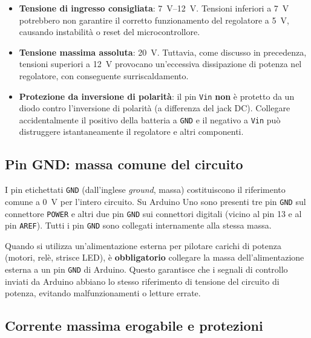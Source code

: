 \begin{itemize}
    \item \textbf{Tensione di ingresso consigliata}: \SIrange{7}{12}{\volt}. Tensioni inferiori a \SI{7}{\volt} potrebbero non garantire il corretto funzionamento del regolatore a \SI{5}{\volt}, causando instabilità o reset del microcontrollore.
    \item \textbf{Tensione massima assoluta}: \SI{20}{\volt}. Tuttavia, come discusso in precedenza, tensioni superiori a \SI{12}{\volt} provocano un'eccessiva dissipazione di potenza nel regolatore, con conseguente surriscaldamento.
    \item \textbf{Protezione da inversione di polarità}: il pin \texttt{Vin} \textbf{non} è protetto da un diodo contro l'inversione di polarità (a differenza del jack DC). Collegare accidentalmente il positivo della batteria a \texttt{GND} e il negativo a \texttt{Vin} può distruggere istantaneamente il regolatore e altri componenti.
\end{itemize}

\subsection*{Pin GND: massa comune del circuito}

I pin etichettati \texttt{GND} (dall'inglese \textit{ground}, massa) costituiscono il riferimento comune a \SI{0}{\volt} per l'intero circuito. Su Arduino Uno sono presenti tre pin \texttt{GND} sul connettore \texttt{POWER} e altri due pin \texttt{GND} sui connettori digitali (vicino al pin 13 e al pin \texttt{AREF}). Tutti i pin \texttt{GND} sono collegati internamente alla stessa massa.

\begin{tcolorbox}[colback=blue!4, colframe=blue!60, title=\textbf{Buona pratica – Masse comuni}]
    Quando si utilizza un'alimentazione esterna per pilotare carichi di potenza (motori, relè, strisce LED), è \textbf{obbligatorio} collegare la massa dell'alimentazione esterna a un pin \texttt{GND} di Arduino. Questo garantisce che i segnali di controllo inviati da Arduino abbiano lo stesso riferimento di tensione del circuito di potenza, evitando malfunzionamenti o letture errate.
\end{tcolorbox}

\subsection*{Corrente massima erogabile e protezioni}

